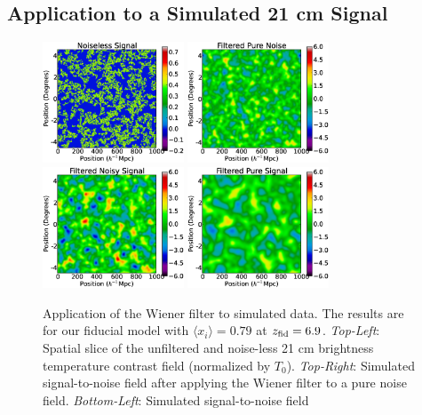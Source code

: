 \subsection{Application to a Simulated 21 cm Signal} \label{sec:wapplied}

\begin{figure}[t]
  \includegraphics[width=4.2cm]{f2a.eps}
  \includegraphics[width=4.2cm]{f2b.eps}
  \includegraphics[width=4.2cm]{f2c.eps}
  \includegraphics[width=4.2cm]{f2d.eps}
  \caption{Application of the Wiener filter to simulated data. The
results are for our fiducial model with $\langle x_i \rangle = 0.79$ at $z_{\rm fid} = 6.9$. \textit{Top-Left}:
    Spatial slice of the unfiltered and noise-less 21 cm brightness
    temperature contrast field (normalized by
    $T_0$). \textit{Top-Right}: Simulated signal-to-noise field after
    applying the Wiener filter to a pure noise
    field. \textit{Bottom-Left}: Simulated signal-to-noise field
}
\end{figure}
